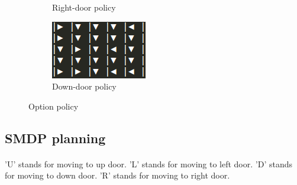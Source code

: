 \documentclass[]{article}
\begin{document}
\begin{figure}
\begin{subfigure}[b]{0.475\textwidth}
		\caption{Right-door policy}
	\end{subfigure}
	\begin{subfigure}[b]{0.475\textwidth}
		\centering
		\includegraphics[width=.9\linewidth]{down_policy.png}
		\caption{Down-door policy}
	\end{subfigure}
	\caption{Option policy}
\end{figure}

\subsection{SMDP planning}
\paragraph{}'U' stands for moving to up door. 'L' stands for moving to left door. 'D' stands for moving to down door. 'R' stands for moving to right door.
\end{document}
